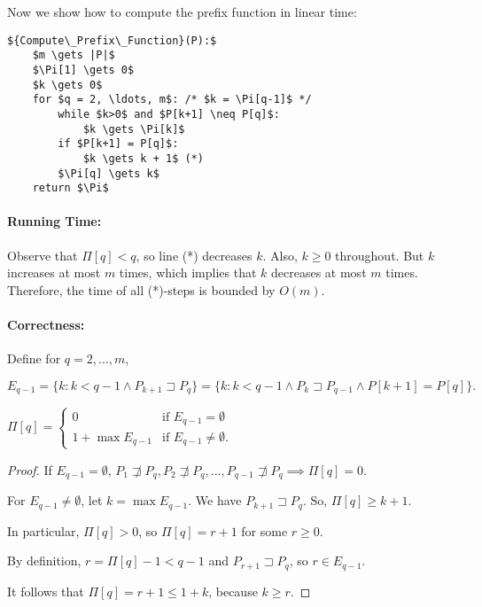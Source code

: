 \bigskip

\noindent Now we show how to compute the prefix function in linear time:

\begin{lstlisting}[mathescape]
${Compute\_Prefix\_Function}(P):$
	$m \gets |P|$
	$\Pi[1] \gets 0$
	$k \gets 0$
	for $q = 2, \ldots, m$: /* $k = \Pi[q-1]$ */
		while $k>0$ and $P[k+1] \neq P[q]$:
			$k \gets \Pi[k]$
		if $P[k+1] = P[q]$:
			$k \gets k + 1$ (*)
		$\Pi[q] \gets k$
	return $\Pi$
\end{lstlisting}

\paragraph{Running Time:} Observe that $\Pi[q] < q$, so line (*) decreases $k$. Also, $k \ge 0$ throughout. But $k$ increases at most $m$ times, which implies that $k$ decreases at most $m$ times. Therefore, the time of all (*)-steps is bounded by $O(m)$.

\paragraph{Correctness:} Define for $q = 2, \ldots, m$,

$$E_{q-1} = \{k : k < q-1 \wedge P_{k+1} \sqsupset P_q\} = \{k: k < q - 1 \wedge P_k \sqsupset P_{q-1} \wedge P[k+1] = P[q]\}.$$

\begin{mylemma}
$\Pi[q] = \begin{cases} 0 &\mbox{if } E_{q-1} = \emptyset \\
1 + \max E_{q-1} & \mbox{if } E_{q-1} \neq \emptyset . \end{cases}$
\end{mylemma}
\begin{proof}
	If $E_{q-1} = \emptyset$, $P_1 \not \sqsupset P_q, P_2 \not \sqsupset P_q, \ldots, P_{q-1} \not \sqsupset P_q \implies \Pi[q] = 0$.
	
	For $E_{q-1} \neq \emptyset$, let $k= \max E_{q-1}$. We have $P_{k+1} \sqsupset P_q$. So, $\Pi[q] \ge k+1$.
	
	In particular, $\Pi[q] > 0$, so $\Pi[q] = r + 1$ for some $r \ge 0$.
	
	By definition, $r = \Pi[q]-1 < q-1$ and $P_{r+1} \sqsupset P_q$, so $r \in E_{q-1}$.
	
	It follows that $\Pi[q] = r + 1 \le 1 + k$, because $k \ge r$.
\end{proof}

